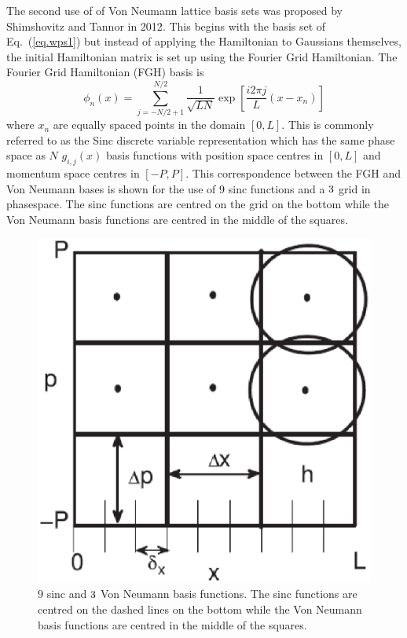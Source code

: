  
 The second use of of Von Neumann lattice basis sets was proposed by Shimshovitz and Tannor in 2012\cite{Shimshovitz2012}.  This begins with the basis set of Eq.~(\ref{eq.wps1}) but instead of applying the Hamiltonian to Gaussians themselves, the initial Hamiltonian matrix is set up using the Fourier Grid Hamiltonian\cite{Tannor2007}.  The Fourier Grid Hamiltonian (FGH) basis is
 \begin{equation}\label{eq.four}
\phi_n \left(x\right) = \sum_{j=-N/2+1}^{N/2}\dfrac{1}{\sqrt{LN}} \exp\left[\dfrac{i2 \pi j}{L}\left(x-x_n\right)\right]
 \end{equation}
where $x_n$ are equally spaced points in the domain $[0,L]$.  This is commonly referred to as the Sinc discrete variable representation which has the same phase space as $N$ $g_{i,j}\left(x\right)$ basis functions with position space centres in $\left[0,L\right]$ and momentum space centres in $\left[-P,P\right]$. This correspondence between the FGH and Von Neumann bases is shown for the use of 9 sinc functions and a $3\time3$ grid in phasespace.  The sinc functions are centred on the grid on the bottom while the Von Neumann basis functions are centred in the middle of the squares.
\begin{figure}[!ht]
\begin{center}
\includegraphics[scale=0.5]{shim.eps}
\caption{9 sinc and $3\time3$ Von Neumann basis functions. The sinc functions are centred on the dashed lines on the bottom while the Von Neumann basis functions are centred in the middle of the squares.}
\label{fig.r4}
\end{center}
\end{figure}


